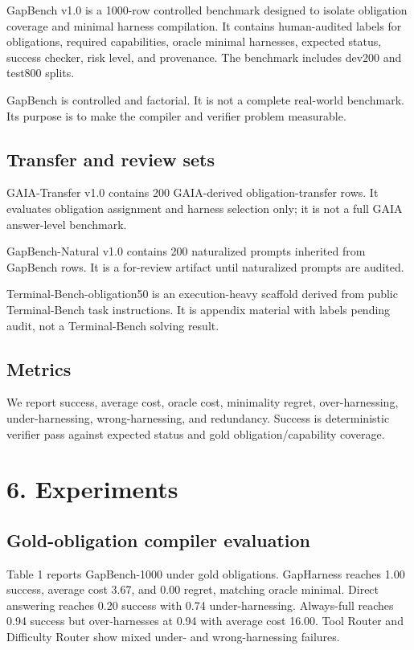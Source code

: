 \documentclass[
  10pt,
]{article}
\begin{document}
GapBench v1.0 is a 1000-row controlled benchmark designed to isolate
obligation coverage and minimal harness compilation. It contains
human-audited labels for obligations, required capabilities, oracle
minimal harnesses, expected status, success checker, risk level, and
provenance. The benchmark includes dev200 and test800 splits.

GapBench is controlled and factorial. It is not a complete real-world
benchmark. Its purpose is to make the compiler and verifier problem
measurable.

\subsection{Transfer and review sets}\label{transfer-and-review-sets}

GAIA-Transfer v1.0 contains 200 GAIA-derived obligation-transfer rows.
It evaluates obligation assignment and harness selection only; it is not
a full GAIA answer-level benchmark.

GapBench-Natural v1.0 contains 200 naturalized prompts inherited from
GapBench rows. It is a for-review artifact until naturalized prompts are
audited.

Terminal-Bench-obligation50 is an execution-heavy scaffold derived from
public Terminal-Bench task instructions. It is appendix material with
labels pending audit, not a Terminal-Bench solving result.

\subsection{Metrics}\label{metrics}

We report success, average cost, oracle cost, minimality regret,
over-harnessing, under-harnessing, wrong-harnessing, and redundancy.
Success is deterministic verifier pass against expected status and gold
obligation/capability coverage.

\section{6. Experiments}\label{experiments}

\subsection{Gold-obligation compiler
evaluation}\label{gold-obligation-compiler-evaluation}

Table 1 reports GapBench-1000 under gold obligations. GapHarness reaches
1.00 success, average cost 3.67, and 0.00 regret, matching oracle
minimal. Direct answering reaches 0.20 success with 0.74
under-harnessing. Always-full reaches 0.94 success but over-harnesses at
0.94 with average cost 16.00. Tool Router and Difficulty Router show
mixed under- and wrong-harnessing failures.
\end{document}
